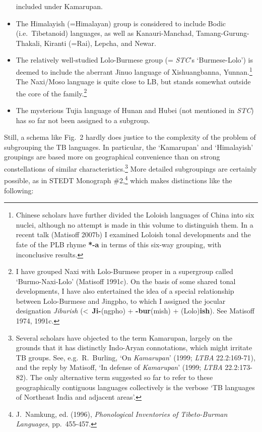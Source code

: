 \begin{itemize}
included under Kamarupan.
\item The Himalayish (=Himalayan) group is considered to include Bodic (i.e.\
\mbox{Tibetanoid}) languages, as well as Kanauri-Manchad, Tamang-Gurung-Thakali,
Kiranti (=Rai), Lepcha, and Newar.
\item The relatively well-studied Lolo-Burmese group (= \textit{STC}’s ‘Burmese-Lolo’) is
deemed to include the aberrant Jinuo language of Xishuangbanna,
Yunnan.\footnote{Chinese scholars have further divided the Loloish languages of
China into six nuclei, although no attempt is made in this volume to distinguish
them.  In a recent talk (Matisoff 2007b) I examined Loloish tonal developments
and the fate of the PLB rhyme \textbf{*-a} in terms of this six-way grouping, with
inconclusive results.}  The Naxi/Moso language is quite close to LB, but stands
somewhat outside the core of the family.\footnote{I have grouped Naxi with
Lolo-Burmese proper in a supergroup called ‘Burmo-Naxi-Lolo’ (Matisoff 1991c). 
On the basis of some shared tonal developments, I have also entertained the idea
of a special relationship between Lolo-Burmese and Jingpho, to which I assigned
the jocular designation \textit{Jiburish} (<~\textbf{Ji-}(ngpho)
+ \textbf{-bur}(mish) + (Lolo)\textbf{ish}).  See
Matisoff 1974, 1991c.}
\item The mysterious Tujia language of Hunan and Hubei (not mentioned in \textit{STC}) has so
far not been assigned to a subgroup.
\end{itemize}


Still, a schema like Fig.~2 hardly does justice to the complexity
of the problem of subgrouping the TB languages.  In particular, the ‘Kamarupan’
and ‘Himalayish’ groupings are based more on geographical convenience than on
strong constellations of similar characteristics.\footnote{Several scholars have objected to the term Kamarupan,
largely on the grounds that it has distinctly Indo-Aryan connotations, which
might irritate TB groups.  See, e.g.\ R.~Burling, ‘On \textit{Kamarupan}’ (1999; \textit{LTBA}
22.2:169-71), and the reply by Matisoff, ‘In defense of \textit{Kamarupan}’
(1999; \textit{LTBA} 22.2:173-82).  The only alternative term
suggested so far to refer to these
geographically contiguous languages collectively is the verbose ‘TB languages of
Northeast India and adjacent areas’.}
More detailed subgroupings are certainly possible, as in
STEDT Monograph \#2,\footnote{J.~Namkung, ed. (1996),
\textit{Phonological Inventories of Tibeto-Burman Languages},
pp.~455-457.}
which makes distinctions like the following:


